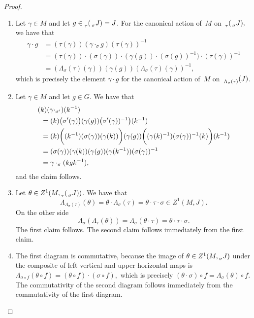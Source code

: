 \documentclass[a4paper,english,12pt]{amsart}
\newcommand{\sJ}{\prescript{}{\sigma}J}
\numberwithin{equation}{subsection}
\begin{document}
\begin{proof}
\begin{enumerate}
\item  Let $\gamma\in M$ and let $g\in \prescript{}{\tau}(\prescript{}{\sigma}J)=J$. For the canonical action of~$M$ on~$\prescript{}{\tau}(\prescript{}{\sigma}J),$ we have that 
\begin{align*}\gamma\cdot g&=(\tau(\gamma)) (\gamma\cdot_{\sigma}g)(\tau(\gamma))^{-1}\\&=(\tau(\gamma)) \cdot (\sigma(\gamma))\cdot (\gamma(g))\cdot(\sigma(g))^{-1}) \cdot (\tau(\gamma))^{-1}\\
&=(\Lambda_{\sigma}(\tau)(\gamma))(\gamma(g))(\Lambda_{\sigma}(\tau)(\gamma))^{-1},
\end{align*}
which is precisely the element $\gamma\cdot g$ for the canonical action of~$M$ on~$\prescript{}{\Lambda_{\sigma}(\tau)}(J)$. %
\item Let $\gamma\in M$ and let $g\in G$. We have that\begin{align*}(k)(\gamma\cdot_{\sigma'})(k^{-1})\hskip-2cm&\\&=(k)\big(\sigma'(\gamma)\big)(\gamma(g))\big(\sigma'(\gamma))^{-1}\big)(k^{-1})\\
&=(k)\bigg((k^{-1})(\sigma(\gamma))(\gamma(k))\bigg)(\gamma(g))\bigg((\gamma(k)^{-1})(\sigma(\gamma))^{-1}(k)\bigg)(k^{-1})\\
&=(\sigma(\gamma))(\gamma(k))(\gamma(g))(\gamma(k^{-1}))(\sigma(\gamma))^{-1}\\
&=\gamma\cdot_{\sigma}(kgk^{-1}),
\end{align*}
and the claim follows.
\item Let $\theta\in Z^1(M,\prescript{}{\tau}(\prescript{}{\sigma}J))$. We have that $$\Lambda_{\Lambda_{\sigma}(\tau)}(\theta)=\theta\cdot \Lambda_{\sigma}(\tau)=\theta\cdot \tau\cdot\sigma\in Z^1(M, J).$$ On the other side $$\Lambda_{\sigma}(\Lambda_{\tau}(\theta))=\Lambda_{\sigma}(\theta\cdot\tau)=\theta\cdot\tau\cdot\sigma.$$ The first claim follows. The second claim follows immediately from the first claim.
\item The first diagram is commutative, because the image of $\theta\in Z^1(M, \sJ)$ under the composite of left vertical and upper horizontal maps is $\Lambda_{\sigma\circ f}(\theta\circ f)=(\theta\circ f)\cdot (\sigma\circ f),$ which is precisely $(\theta\cdot \sigma)\circ f=\Lambda_{\sigma}(\theta)\circ f.$ The commutativity of the second diagram follows immediately from the commutativity of the first diagram.

\end{enumerate}
\end{proof}
\end{document}
